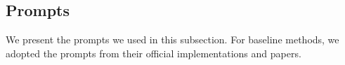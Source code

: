 \subsection{Prompts}
\label{app:prompts}

We present the prompts we used in this subsection. 
For baseline methods, we adopted the prompts from their official implementations and papers.  

\clearpage


\clearpage







